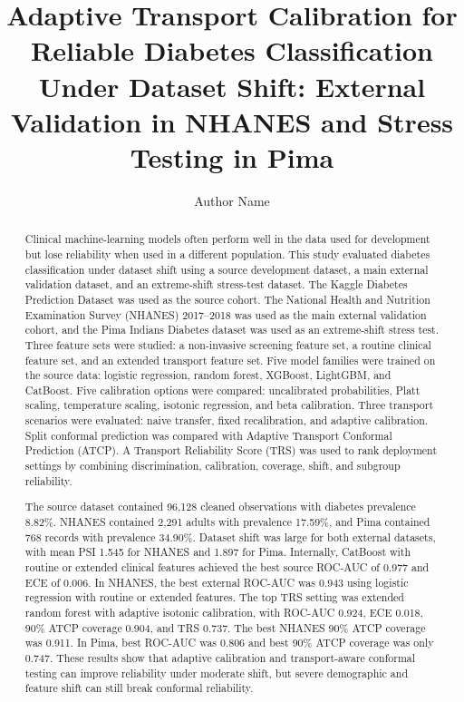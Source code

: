 \documentclass[11pt]{article}
\title{Adaptive Transport Calibration for Reliable Diabetes Classification Under Dataset Shift: External Validation in NHANES and Stress Testing in Pima}
\author[1]{Author Name}
\affil[1]{Department and Institution, City, Country}
\date{}
\begin{document}
\maketitle

\begin{abstract}
Clinical machine-learning models often perform well in the data used for development but lose reliability when used in a different population. This study evaluated diabetes classification under dataset shift using a source development dataset, a main external validation dataset, and an extreme-shift stress-test dataset. The Kaggle Diabetes Prediction Dataset was used as the source cohort. The National Health and Nutrition Examination Survey (NHANES) 2017--2018 was used as the main external validation cohort, and the Pima Indians Diabetes dataset was used as an extreme-shift stress test. Three feature sets were studied: a non-invasive screening feature set, a routine clinical feature set, and an extended transport feature set. Five model families were trained on the source data: logistic regression, random forest, XGBoost, LightGBM, and CatBoost. Five calibration options were compared: uncalibrated probabilities, Platt scaling, temperature scaling, isotonic regression, and beta calibration. Three transport scenarios were evaluated: naive transfer, fixed recalibration, and adaptive calibration. Split conformal prediction was compared with Adaptive Transport Conformal Prediction (ATCP). A Transport Reliability Score (TRS) was used to rank deployment settings by combining discrimination, calibration, coverage, shift, and subgroup reliability.

The source dataset contained 96,128 cleaned observations with diabetes prevalence 8.82\%. NHANES contained 2,291 adults with prevalence 17.59\%, and Pima contained 768 records with prevalence 34.90\%. Dataset shift was large for both external datasets, with mean PSI 1.545 for NHANES and 1.897 for Pima. Internally, CatBoost with routine or extended clinical features achieved the best source ROC-AUC of 0.977 and ECE of 0.006. In NHANES, the best external ROC-AUC was 0.943 using logistic regression with routine or extended features. The top TRS setting was extended random forest with adaptive isotonic calibration, with ROC-AUC 0.924, ECE 0.018, 90\% ATCP coverage 0.904, and TRS 0.737. The best NHANES 90\% ATCP coverage was 0.911. In Pima, best ROC-AUC was 0.806 and best 90\% ATCP coverage was only 0.747. These results show that adaptive calibration and transport-aware conformal testing can improve reliability under moderate shift, but severe demographic and feature shift can still break conformal reliability.
\end{abstract}
\end{document}
